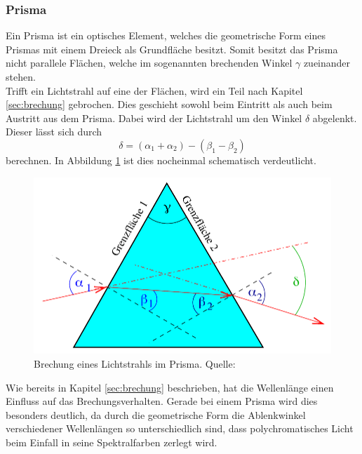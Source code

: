 \subsubsection*{Prisma}
\label{sec:prisma}
Ein Prisma ist ein optisches Element, welches die geometrische Form eines Prismas mit einem Dreieck als Grundfläche
besitzt. Somit besitzt das Prisma nicht parallele Flächen, welche im sogenannten
brechenden Winkel $\gamma$ zueinander stehen.
\\\noindent
Trifft ein Lichtstrahl auf eine der Flächen, wird ein Teil nach Kapitel
\ref{sec:brechung} gebrochen. Dies geschieht sowohl beim Eintritt als auch beim Austritt aus dem Prisma. Dabei wird
der Lichtstrahl um den Winkel $\delta$ abgelenkt. Dieser lässt sich durch
\begin{equation}
    \delta=(\alpha_1+\alpha_2)-(\beta_1-\beta_2)
    \label{eqn:ablenkwinkel}
\end{equation}
berechnen. In Abbildung \ref{fig:prisma2} ist dies nocheinmal schematisch verdeutlicht.
\begin{figure}[H]
    \centering
    \includegraphics[scale = 0.4]{pictures/Prisma.png}
    \caption{Brechung eines Lichtstrahls im Prisma. Quelle: \cite{AP01}}
    \label{fig:prisma2}
\end{figure}
\noindent
Wie bereits in Kapitel \ref{sec:brechung} beschrieben, hat die Wellenlänge einen Einfluss auf das Brechungsverhalten.
Gerade bei einem Prisma wird dies besonders deutlich, da durch die geometrische Form die Ablenkwinkel verschiedener
Wellenlängen so unterschiedlich sind, dass polychromatisches Licht beim Einfall in seine Spektralfarben zerlegt wird.
